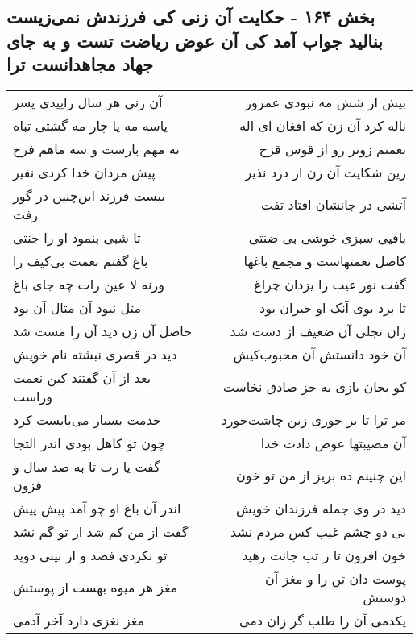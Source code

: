 \begin{center}
\section*{بخش ۱۶۴ - حکایت آن زنی کی فرزندش نمی‌زیست بنالید جواب آمد کی آن عوض ریاضت تست و به جای جهاد مجاهدانست ترا}
\label{sec:sh164}
\begin{longtable}{l p{0.5cm} r}
آن زنی هر سال زاییدی پسر
&&
بیش از شش مه نبودی عمرور
\\
یاسه مه یا چار مه گشتی تباه
&&
ناله کرد آن زن که افغان ای اله
\\
نه مهم بارست و سه ماهم فرح
&&
نعمتم زوتر رو از قوس قزح
\\
پیش مردان خدا کردی نفیر
&&
زین شکایت آن زن از درد نذیر
\\
بیست فرزند این‌چنین در گور رفت
&&
آتشی در جانشان افتاد تفت
\\
تا شبی بنمود او را جنتی
&&
باقیی سبزی خوشی بی ضنتی
\\
باغ گفتم نعمت بی‌کیف را
&&
کاصل نعمتهاست و مجمع باغها
\\
ورنه لا عین رات چه جای باغ
&&
گفت نور غیب را یزدان چراغ
\\
مثل نبود آن مثال آن بود
&&
تا برد بوی آنک او حیران بود
\\
حاصل آن زن دید آن را مست شد
&&
زان تجلی آن ضعیف از دست شد
\\
دید در قصری نبشته نام خویش
&&
آن خود دانستش آن محبوب‌کیش
\\
بعد از آن گفتند کین نعمت وراست
&&
کو بجان بازی به جز صادق نخاست
\\
خدمت بسیار می‌بایست کرد
&&
مر ترا تا بر خوری زین چاشت‌خورد
\\
چون تو کاهل بودی اندر التجا
&&
آن مصیبتها عوض دادت خدا
\\
گفت یا رب تا به صد سال و فزون
&&
این چنینم ده بریز از من تو خون
\\
اندر آن باغ او چو آمد پیش پیش
&&
دید در وی جمله فرزندان خویش
\\
گفت از من کم شد از تو گم نشد
&&
بی دو چشم غیب کس مردم نشد
\\
تو نکردی فصد و از بینی دوید
&&
خون افزون تا ز تب جانت رهید
\\
مغز هر میوه بهست از پوستش
&&
پوست دان تن را و مغز آن دوستش
\\
مغز نغزی دارد آخر آدمی
&&
یکدمی آن را طلب گر زان دمی
\\
\end{longtable}
\end{center}
